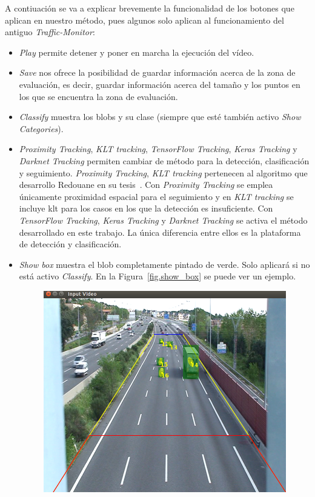 A contiuación se va a explicar brevemente la funcionalidad de los botones que aplican en nuestro método, pues algunos solo aplican al funcionamiento del antiguo \textit{Traffic-Monitor}:
\begin{itemize}
    \item \textit{Play} permite detener y poner en marcha la ejecución del vídeo.
    \item \textit{Save} nos ofrece la posibilidad de guardar información acerca de la zona de evaluación, es decir, guardar información acerca del tamaño y los puntos en los que se encuentra la zona de evaluación.
    \item \textit{Classify} muestra los blobs y su clase (siempre que esté también activo \textit{Show Categories}).
    \item \textit{Proximity Tracking}, \textit{KLT tracking}, \textit{TensorFlow Tracking}, \textit{Keras Tracking} y \textit{Darknet Tracking} permiten cambiar de método para la detección, clasificación y seguimiento. \textit{Proximity Tracking}, \textit{KLT tracking} pertenecen al algoritmo que desarrollo Redouane en su tesis~\cite{redo_tesis}. Con \textit{Proximity Tracking} se emplea únicamente proximidad espacial para el seguimiento y en \textit{KLT tracking} se incluye \acrshort{klt} para los casos en los que la detección es insuficiente. Con \textit{TensorFlow Tracking}, \textit{Keras Tracking} y \textit{Darknet Tracking} se activa el método desarrollado en este trabajo. La única diferencia entre ellos es la plataforma de detección y clasificación.
    \item \textit{Show box} muestra el blob completamente pintado de verde. Solo aplicará si no está activo \textit{Classify}. En la Figura~\ref{fig.show_box} se puede ver un ejemplo.
        \begin{figure}[H] 
    \begin{center}
    	\includegraphics[scale=0.35]{figures/Diseno_global/show_box.png}

\end{center}
\end{figure}
\end{itemize}

